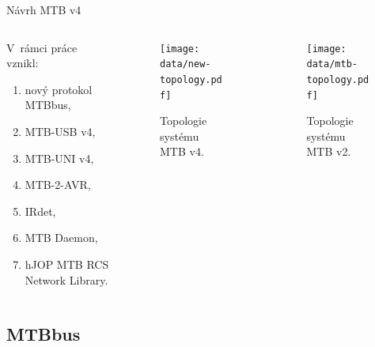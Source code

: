 \documentclass[aspectratio=169]{beamer}
\begin{document}
\begin{frame}{Návrh MTB v4}
\begin{columns}
	\begin{column}{.3\textwidth}
		V rámci práce vznikl:
		\begin{enumerate}
		\item nový protokol MTBbus,
		\item MTB-USB v4,
		\item MTB-UNI v4,
		\item MTB-2-AVR,
		\item IRdet,
		\item MTB Daemon,
		\item hJOP MTB RCS Network Library.
		\end{enumerate}
	\end{column}
	\begin{column}{.4\textwidth}
		\begin{figure}
		\texttt{[image: data/new-topology.pdf]}
		\caption{Topologie systému MTB v4.}
		\end{figure}
	\end{column}
	\begin{column}{.3\textwidth}
		\begin{figure}
		\texttt{[image: data/mtb-topology.pdf]}
		\caption{Topologie systému MTB v2.}
		\end{figure}
	\end{column}
\end{columns}
\end{frame}


\subsection{MTBbus}
\end{document}
